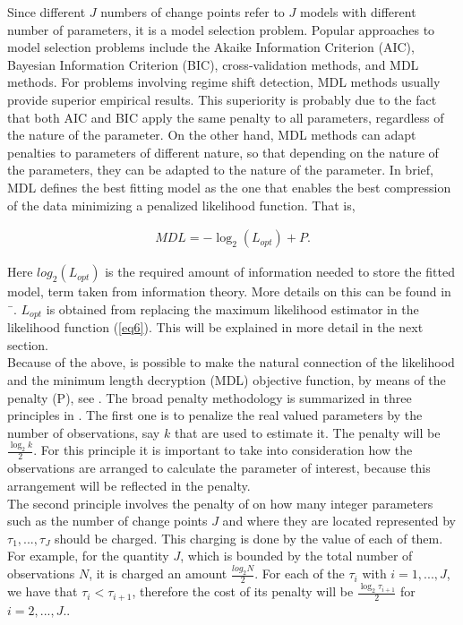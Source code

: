 \documentclass[APA,STIX1COL]{WileyNJD-v2}
\begin{document}
Since different $J$ numbers of change points refer to $J$ models with different number of parameters, it is a model selection problem. Popular approaches to model selection problems include the Akaike Information Criterion (AIC), Bayesian Information Criterion (BIC), cross-validation methods, and MDL methods. For problems involving regime shift detection, MDL methods usually provide superior empirical results. This superiority is probably due to the fact that both AIC and BIC apply the same penalty to all parameters, regardless of the nature of the parameter. On the other hand, MDL methods can adapt penalties to parameters of different nature, so that depending on the nature of the parameters, they can be adapted to the nature of the parameter. In brief, MDL defines the best fitting model as the one that enables the best compression of the data minimizing a penalized likelihood function. That is, 

\begin{align}
	\label{eq6}
MDL=-\log_2(L_{opt})+P.
\end{align}


Here $log_2(L_{opt})$ is the required amount of information needed to store the fitted model, term taken from information theory. More details on this can be found in ¯\cite{Davis2006}. $L_{opt}$ is obtained from replacing the maximum likelihood estimator in the likelihood function (\ref{eq6}). This will be explained in more detail in the next section. \\


Because of the above, is possible to make the natural connection of the likelihood and the minimum length decryption (MDL) objective function, by means of the penalty (P), see \cite{Davis2006}. The broad penalty methodology is summarized in three principles in \cite{Li2012}. The first one is to penalize the real valued parameters by the number of observations, say $k$ that are used to estimate it. The penalty will be $\frac{\log_2 k}{2}$. For this principle it is important to take into consideration how the observations are arranged to calculate the parameter of interest, because this arrangement will be reflected in the penalty.\\

The second principle involves the penalty of on how many integer parameters such as the number of change points $J$ and where they are located represented by $\tau_{1}, ..., \tau_{J}$ should be charged. This charging is done by the value of each of them. For example, for the quantity $J$, which is bounded by the total number of observations $N$, it is charged an amount $\frac{log_2N}{2}$. For each of the $\tau_{i}$ with $i=1,...,J$, we have that $\tau_{i}<\tau_{i+1}$, therefore the cost of its penalty will be $\frac{\log_2 \tau_{i+1}}{2}$ for $i=2,...,J$..\\
\end{document}
